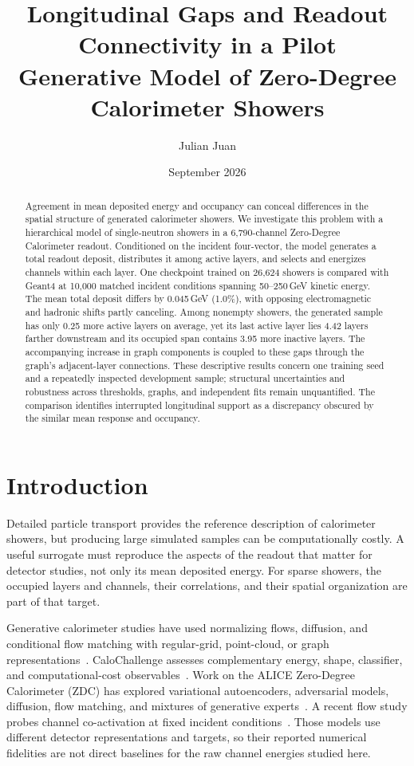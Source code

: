 \documentclass[11pt]{article}
\title{Longitudinal Gaps and Readout Connectivity in a Pilot\\Generative Model of Zero-Degree Calorimeter Showers}
\author{Julian Juan}
\date{September 2026}
\begin{document}
\maketitle

\begin{abstract}
Agreement in mean deposited energy and occupancy can conceal differences in the spatial structure of generated calorimeter showers. We investigate this problem with a hierarchical model of single-neutron showers in a 6,790-channel Zero-Degree Calorimeter readout. Conditioned on the incident four-vector, the model generates a total readout deposit, distributes it among active layers, and selects and energizes channels within each layer. One checkpoint trained on 26,624 showers is compared with Geant4 at 10,000 matched incident conditions spanning 50--250\,GeV kinetic energy. The mean total deposit differs by 0.045\,GeV (1.0\%), with opposing electromagnetic and hadronic shifts partly canceling. Among nonempty showers, the generated sample has only 0.25 more active layers on average, yet its last active layer lies 4.42 layers farther downstream and its occupied span contains 3.95 more inactive layers. The accompanying increase in graph components is coupled to these gaps through the graph's adjacent-layer connections. These descriptive results concern one training seed and a repeatedly inspected development sample; structural uncertainties and robustness across thresholds, graphs, and independent fits remain unquantified. The comparison identifies interrupted longitudinal support as a discrepancy obscured by the similar mean response and occupancy.
\end{abstract}

\section{Introduction}

Detailed particle transport provides the reference description of calorimeter showers, but producing large simulated samples can be computationally costly. A useful surrogate must reproduce the aspects of the readout that matter for detector studies, not only its mean deposited energy. For sparse showers, the occupied layers and channels, their correlations, and their spatial organization are part of that target.

Generative calorimeter studies have used normalizing flows, diffusion, and conditional flow matching with regular-grid, point-cloud, or graph representations~\cite{caloflow,calodiffusion,calograph,caloclouds2,calodream}. CaloChallenge assesses complementary energy, shape, classifier, and computational-cost observables~\cite{calochallenge,kansalmetrics}. Work on the ALICE Zero-Degree Calorimeter (ZDC) has explored variational autoencoders, adversarial models, diffusion, flow matching, and mixtures of generative experts~\cite{dubinskizdc,kitazdc,fasterzdc,expertsim,wojnar2025}. A recent flow study probes channel co-activation at fixed incident conditions~\cite{majerz2026}. Those models use different detector representations and targets, so their reported numerical fidelities are not direct baselines for the raw channel energies studied here.
\end{document}
